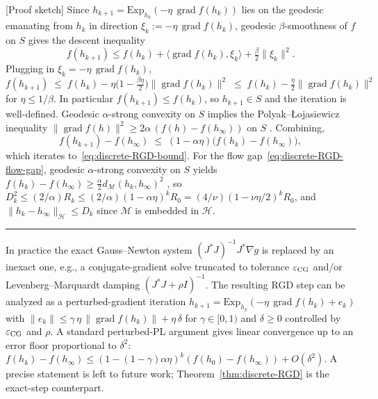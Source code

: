 \documentclass[twoside,11pt]{article}
\newcommand{\BlackBoxProof}{\rule{1.5ex}{1.5ex}}
\renewenvironment{proof}{\par\noindent{\bf Proof\ }}{\hfill\BlackBoxProof\par\medskip}
\newcommand{\Exp}{\mathrm{Exp}}
\newcommand{\grad}{\operatorname{grad} }
\newcommand{\calH}{\mathcal{H}}
\newcommand{\calM}{\mathcal{M}}
\begin{document}
\begin{proof}[Proof sketch]
Since $h_{k+1}=\Exp_{h_k}(-\eta\,\grad f(h_k))$ lies on the geodesic emanating from $h_k$ in direction $\xi_k:=-\eta\,\grad f(h_k)$, geodesic $\beta$-smoothness of $f$ on $S$ \citep[Lemma~11.28]{boumal2023intromanifolds} gives the descent inequality
\[
f(h_{k+1}) \le f(h_k) + \langle \grad f(h_k), \xi_k\rangle + \tfrac{\beta}{2}\|\xi_k\|^2.
\]
Plugging in $\xi_k=-\eta\,\grad f(h_k)$,
\[
    f(h_{k+1}) \;\le\; f(h_k) - \eta\bigl(1 - \tfrac{\beta\eta}{2}\bigr)\|\grad f(h_k)\|^2 \;\le\; f(h_k) - \tfrac{\eta}{2}\|\grad f(h_k)\|^2
\]
for $\eta \le 1/\beta$. In particular $f(h_{k+1}) \le f(h_k)$, so $h_{k+1} \in S$ and the iteration is well-defined.
Geodesic $\alpha$-strong convexity on $S$ implies the Polyak--\L{}ojasiewicz inequality $\|\grad f(h)\|^2 \ge 2\alpha\,(f(h)-f(h_\infty))$ on $S$ \citep[Lemma~11.28]{boumal2023intromanifolds}. Combining,
\[
    f(h_{k+1}) - f(h_\infty) \;\le\; (1 - \alpha\eta)\bigl(f(h_k) - f(h_\infty)\bigr),
\]
which iterates to~\eqref{eq:discrete-RGD-bound}.
For the flow gap~\eqref{eq:discrete-RGD-flow-gap}, geodesic $\alpha$-strong convexity on $S$ yields $f(h_k)-f(h_\infty)\ge \tfrac{\alpha}{2}d_\calM(h_k,h_\infty)^2$ \citep[Theorem~11.21]{boumal2023intromanifolds}, so
$D_k^2 \le (2/\alpha)R_k \le (2/\alpha)(1-\alpha\eta)^k R_0 = (4/\nu)(1-\nu\eta/2)^k R_0$,
and $\|h_k-h_\infty\|_\calH\le D_k$ since $\calM$ is embedded in $\calH$.
\end{proof}

\begin{remark}\label{rem:inexact-discrete}
In practice the exact Gauss--Newton system $(J^*J)^{-1}J^*\nabla g$ is replaced by an inexact one, e.g., a conjugate-gradient solve truncated to tolerance $\varepsilon_{\rm CG}$ and/or Levenberg--Marquardt damping $(J^*J+\rho I)^{-1}$. The resulting RGD step can be analyzed as a perturbed-gradient iteration $h_{k+1}=\Exp_{h_k}(-\eta\,\grad f(h_k)+e_k)$ with $\|e_k\|\le\gamma\,\eta\,\|\grad f(h_k)\|+\eta\,\delta$ for $\gamma\in[0,1)$ and $\delta\ge 0$ controlled by $\varepsilon_{\rm CG}$ and $\rho$. A standard perturbed-PL argument \citep[Theorem~11.31]{boumal2023intromanifolds} gives linear convergence up to an error floor proportional to $\delta^2$:
\(
    f(h_k)-f(h_\infty)\le(1-(1-\gamma)\alpha\eta)^k(f(h_0)-f(h_\infty))+O(\delta^2).
\)
A precise statement is left to future work; Theorem~\ref{thm:discrete-RGD} is the exact-step counterpart.
\end{remark}
\end{document}
